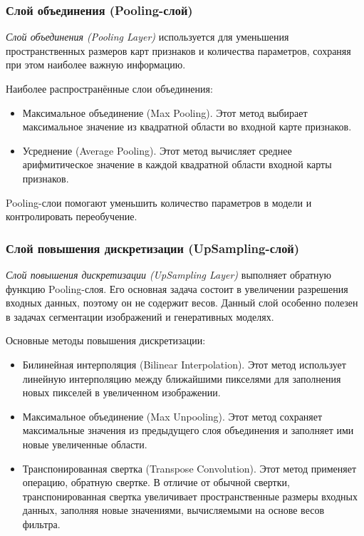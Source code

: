 \subsubsection{Слой объединения (Pooling-слой)}
\par \textit{Слой объединения (Pooling Layer)} используется для уменьшения пространственных размеров карт признаков и количества параметров, сохраняя при этом наиболее важную информацию. 
\par Наиболее распространённые слои объединения:
\begin{itemize}[]
	\item Максимальное объединение (Max Pooling). Этот метод выбирает максимальное значение из квадратной области во входной карте признаков. 
	\item Усреднение (Average Pooling). Этот метод вычисляет среднее арифмитическое значение в каждой квадратной области входной карты признаков.
\end{itemize}
\par Pooling-слои помогают уменьшить количество параметров в модели и контролировать переобучение.

\subsubsection{Слой повышения дискретизации (UpSampling-слой)}
\par \textit{Слой повышения дискретизации (UpSampling Layer)} выполняет обратную функцию Pooling-слоя. Его основная задача состоит в увеличении разрешения входных данных, поэтому он не содержит весов. Данный слой особенно полезен в задачах сегментации изображений и генеративных моделях. 
\par Основные методы повышения дискретизации:
\begin{itemize}[]
	\item Билинейная интерполяция (Bilinear Interpolation). Этот метод использует линейную интерполяцию между ближайшими пикселями для заполнения новых пикселей в увеличенном изображении. 
	\item Максимальное объединение (Max Unpooling). Этот метод сохраняет максимальные значения из предыдущего слоя объединения и заполняет ими новые увеличенные области.
	\item Транспонированная свертка (Transpose Convolution). Этот метод применяет операцию, обратную свертке. В отличие от обычной свертки, транспонированная свертка увеличивает пространственные размеры входных данных, заполняя новые значениями, вычисляемыми на основе весов фильтра. 
\end{itemize} 

